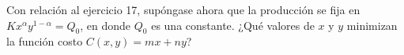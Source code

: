 \item Con relación al ejercicio 17, supóngase ahora que la producción se fija en $Kx^\alpha y^{1-\alpha} = Q_0$, en donde $Q_0$ es una constante. ¿Qué valores de $x$ y $y$ minimizan la función costo $C(x, y) = mx + ny$?
